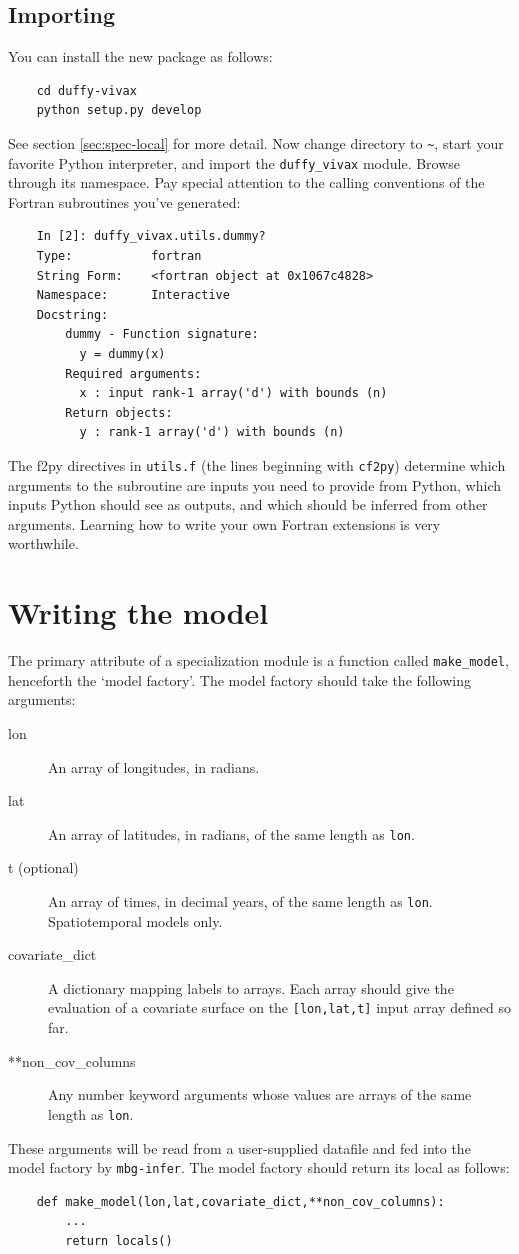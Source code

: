 \subsection{Importing}
You can install the new package as follows:
\begin{verbatim}
    cd duffy-vivax
    python setup.py develop
\end{verbatim}
See section \ref{sec:spec-local} for more detail. Now change directory to \texttt{\~}, start your favorite Python interpreter, and import the \texttt{duffy\_vivax} module. Browse through its namespace. Pay special attention to the calling conventions of the Fortran subroutines you've generated:
\begin{verbatim}
    In [2]: duffy_vivax.utils.dummy?
    Type:           fortran
    String Form:    <fortran object at 0x1067c4828>
    Namespace:      Interactive
    Docstring:
        dummy - Function signature:
          y = dummy(x)
        Required arguments:
          x : input rank-1 array('d') with bounds (n)
        Return objects:
          y : rank-1 array('d') with bounds (n)
\end{verbatim}
The f2py directives in \texttt{utils.f} (the lines beginning with \texttt{cf2py}) determine which arguments to the subroutine are inputs you need to provide from Python, which inputs Python should see as outputs, and which should be inferred from other arguments. Learning how to write your own Fortran extensions is very worthwhile.

\section{Writing the model}

The primary attribute of a specialization module is a function called \texttt{make\_model}, henceforth the `model factory'. The model factory should take the following arguments:
\begin{description}
    \item[lon] An array of longitudes, in radians.
    \item[lat] An array of latitudes, in radians, of the same length as \texttt{lon}.
    \item[t (optional)] An array of times, in decimal years, of the same length as \texttt{lon}. Spatiotemporal models only.
    \item[covariate\_dict] A dictionary mapping labels to arrays. Each array should give the evaluation of a covariate surface on the \texttt{[lon,lat,t]} input array defined so far.
    \item[**non\_cov\_columns] Any number keyword arguments whose values are arrays of the same length as \texttt{lon}.
\end{description}
These arguments will be read from a user-supplied datafile and fed into the model factory by \texttt{mbg-infer}. The model factory should return its local as follows: 
\begin{verbatim}
    def make_model(lon,lat,covariate_dict,**non_cov_columns):
        ...
        return locals()
\end{verbatim}

